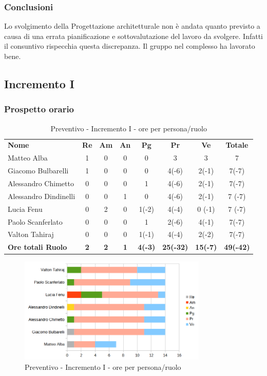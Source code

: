 \subsubsection{Conclusioni}
Lo svolgimento della Progettazione architetturale non è andata quanto previsto a causa di una errata pianificazione e sottovalutazione del lavoro da svolgere. Infatti il consuntivo rispecchia questa discrepanza.
Il gruppo nel complesso ha lavorato bene.


\newpage

\subsection{Incremento I}
\subsubsection{Prospetto orario}

\begin{table} [h!]
	\begin{center}
		\begin{tabular} { m{3.5cm} c c c c c c c }
			\rowcolor{lightgray}
			\textbf{Nome} & \textbf{Re} & \textbf{Am} & \textbf{An} & \textbf{Pg} & \textbf{Pr} & \textbf{Ve} & \textbf{Totale} \\
			Matteo Alba & 1 & 0 & 0 & 0 & 3 & 3 & 7 \\
			Giacomo Bulbarelli & 1 & 0 & 0 & 0 & 4(-6) & 2(-1) & 7(-7) \\
			Alessandro Chimetto & 0 & 0 & 0 & 1 & 4(-6) & 2(-1) & 7(-7) \\
			Alessandro Dindinelli & 0 & 0 & 1 & 0 & 4(-6) & 2(-1) & 7 (-7)\\
			Lucia Fenu & 0 & 2 & 0 & 1(-2) & 4(-4) & 0 (-1)& 7 (-7)\\
			Paolo Scanferlato & 0 & 0 & 0 & 1 & 2(-6) & 4(-1) & 7(-7) \\
			Valton Tahiraj & 0 & 0 & 0 & 1(-1) & 4(-4) & 2(-2) & 7(-7) \\
			\textbf{Ore totali Ruolo} & \textbf{2} & \textbf{2} & \textbf{1} & \textbf{4(-3)} & \textbf{25(-32)}& \textbf{15(-7)} & \textbf{49(-42)}
		\end{tabular}
		\caption{Preventivo - Incremento I - ore per persona/ruolo}
	\end{center}
\end{table}
\begin{figure} [h!]
	\centering
	\includegraphics[width=0.8\textwidth]{res/img/grafici/consuntivo-barre- incremento1.png}
	\caption{Preventivo - Incremento I - ore per persona/ruolo} 
\end{figure}

